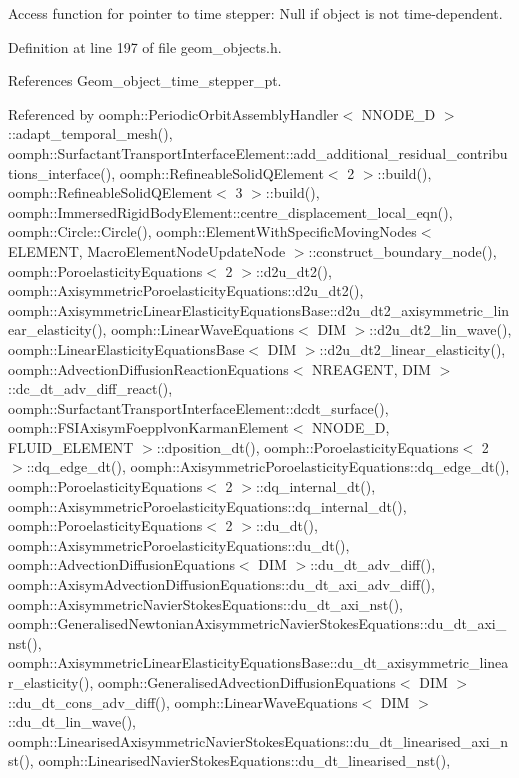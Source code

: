 Access function for pointer to time stepper\+: Null if object is not time-\/dependent. 



Definition at line 197 of file geom\+\_\+objects.\+h.



References Geom\+\_\+object\+\_\+time\+\_\+stepper\+\_\+pt.



Referenced by oomph\+::\+Periodic\+Orbit\+Assembly\+Handler$<$ N\+N\+O\+D\+E\+\_\+D $>$\+::adapt\+\_\+temporal\+\_\+mesh(), oomph\+::\+Surfactant\+Transport\+Interface\+Element\+::add\+\_\+additional\+\_\+residual\+\_\+contributions\+\_\+interface(), oomph\+::\+Refineable\+Solid\+Q\+Element$<$ 2 $>$\+::build(), oomph\+::\+Refineable\+Solid\+Q\+Element$<$ 3 $>$\+::build(), oomph\+::\+Immersed\+Rigid\+Body\+Element\+::centre\+\_\+displacement\+\_\+local\+\_\+eqn(), oomph\+::\+Circle\+::\+Circle(), oomph\+::\+Element\+With\+Specific\+Moving\+Nodes$<$ E\+L\+E\+M\+E\+N\+T, Macro\+Element\+Node\+Update\+Node $>$\+::construct\+\_\+boundary\+\_\+node(), oomph\+::\+Poroelasticity\+Equations$<$ 2 $>$\+::d2u\+\_\+dt2(), oomph\+::\+Axisymmetric\+Poroelasticity\+Equations\+::d2u\+\_\+dt2(), oomph\+::\+Axisymmetric\+Linear\+Elasticity\+Equations\+Base\+::d2u\+\_\+dt2\+\_\+axisymmetric\+\_\+linear\+\_\+elasticity(), oomph\+::\+Linear\+Wave\+Equations$<$ D\+I\+M $>$\+::d2u\+\_\+dt2\+\_\+lin\+\_\+wave(), oomph\+::\+Linear\+Elasticity\+Equations\+Base$<$ D\+I\+M $>$\+::d2u\+\_\+dt2\+\_\+linear\+\_\+elasticity(), oomph\+::\+Advection\+Diffusion\+Reaction\+Equations$<$ N\+R\+E\+A\+G\+E\+N\+T, D\+I\+M $>$\+::dc\+\_\+dt\+\_\+adv\+\_\+diff\+\_\+react(), oomph\+::\+Surfactant\+Transport\+Interface\+Element\+::dcdt\+\_\+surface(), oomph\+::\+F\+S\+I\+Axisym\+Foepplvon\+Karman\+Element$<$ N\+N\+O\+D\+E\+\_\+D, F\+L\+U\+I\+D\+\_\+\+E\+L\+E\+M\+E\+N\+T $>$\+::dposition\+\_\+dt(), oomph\+::\+Poroelasticity\+Equations$<$ 2 $>$\+::dq\+\_\+edge\+\_\+dt(), oomph\+::\+Axisymmetric\+Poroelasticity\+Equations\+::dq\+\_\+edge\+\_\+dt(), oomph\+::\+Poroelasticity\+Equations$<$ 2 $>$\+::dq\+\_\+internal\+\_\+dt(), oomph\+::\+Axisymmetric\+Poroelasticity\+Equations\+::dq\+\_\+internal\+\_\+dt(), oomph\+::\+Poroelasticity\+Equations$<$ 2 $>$\+::du\+\_\+dt(), oomph\+::\+Axisymmetric\+Poroelasticity\+Equations\+::du\+\_\+dt(), oomph\+::\+Advection\+Diffusion\+Equations$<$ D\+I\+M $>$\+::du\+\_\+dt\+\_\+adv\+\_\+diff(), oomph\+::\+Axisym\+Advection\+Diffusion\+Equations\+::du\+\_\+dt\+\_\+axi\+\_\+adv\+\_\+diff(), oomph\+::\+Axisymmetric\+Navier\+Stokes\+Equations\+::du\+\_\+dt\+\_\+axi\+\_\+nst(), oomph\+::\+Generalised\+Newtonian\+Axisymmetric\+Navier\+Stokes\+Equations\+::du\+\_\+dt\+\_\+axi\+\_\+nst(), oomph\+::\+Axisymmetric\+Linear\+Elasticity\+Equations\+Base\+::du\+\_\+dt\+\_\+axisymmetric\+\_\+linear\+\_\+elasticity(), oomph\+::\+Generalised\+Advection\+Diffusion\+Equations$<$ D\+I\+M $>$\+::du\+\_\+dt\+\_\+cons\+\_\+adv\+\_\+diff(), oomph\+::\+Linear\+Wave\+Equations$<$ D\+I\+M $>$\+::du\+\_\+dt\+\_\+lin\+\_\+wave(), oomph\+::\+Linearised\+Axisymmetric\+Navier\+Stokes\+Equations\+::du\+\_\+dt\+\_\+linearised\+\_\+axi\+\_\+nst(), oomph\+::\+Linearised\+Navier\+Stokes\+Equations\+::du\+\_\+dt\+\_\+linearised\+\_\+nst(), 